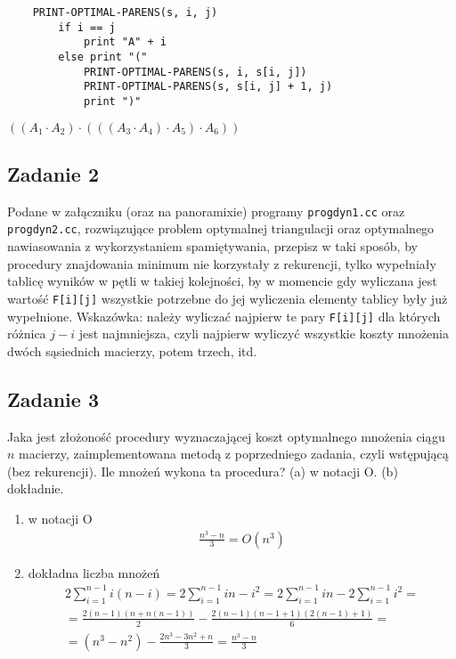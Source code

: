 \documentclass{article}
\begin{document}
\begin{center}
    \begin{lstlisting}
    PRINT-OPTIMAL-PARENS(s, i, j)
        if i == j
            print "A" + i
        else print "("
            PRINT-OPTIMAL-PARENS(s, i, s[i, j])
            PRINT-OPTIMAL-PARENS(s, s[i, j] + 1, j)
            print ")"
    \end{lstlisting}
    $((A_1 \cdot A_2) \cdot (((A_3 \cdot A_4) \cdot A_5) \cdot A_6))$
\end{center}

\subsection*{Zadanie 2}
Podane w załączniku (oraz na panoramixie) programy \verb|progdyn1.cc| oraz \verb|progdyn2.cc|,
rozwiązujące problem optymalnej triangulacji oraz optymalnego nawiasowania z wykorzystaniem
spamiętywania, przepisz w taki sposób, by procedury znajdowania minimum
nie korzystały z rekurencji, tylko wypełniały tablicę wyników w pętli w takiej kolejności,
by w momencie gdy wyliczana jest wartość \verb|F[i][j]| wszystkie potrzebne do jej wyliczenia
elementy tablicy były już wypełnione. Wskazówka: należy wyliczać najpierw te pary
\verb|F[i][j]| dla których różnica $j-i$ jest najmniejsza, czyli najpierw wyliczyć wszystkie
koszty mnożenia dwóch sąsiednich macierzy, potem trzech, itd.

\pagebreak
\subsection*{Zadanie 3}
Jaka jest złożoność procedury wyznaczającej koszt optymalnego mnożenia ciągu
$n$ macierzy, zaimplementowana metodą z poprzedniego zadania, czyli wstępującą (bez rekurencji).
Ile mnożeń wykona ta procedura? (a) w notacji O. (b) dokładnie.
\begin{enumerate}[label=(\alph*)]
    \item w notacji O
          \begin{gather*}
            \frac{n^3-n}{3} = O(n^3)
          \end{gather*}
    \item dokładna liczba mnożeń
          \begin{gather*}
              2\sum_{i=1}^{n-1} i(n-i) = 2\sum_{i=1}^{n-1} in - i^2 = 2\sum_{i=1}^{n-1} in - 2\sum_{i=1}^{n-1} i^2 = \\
              = \frac{2(n-1)(n+n(n-1))}{2} - \frac{2(n-1)(n-1+1)(2(n-1)+1)}{6} = \\
              = (n^3-n^2) - \frac{2n^3-3n^2+n}{3} = \frac{n^3-n}{3}
          \end{gather*}
\end{enumerate}
\end{document}
